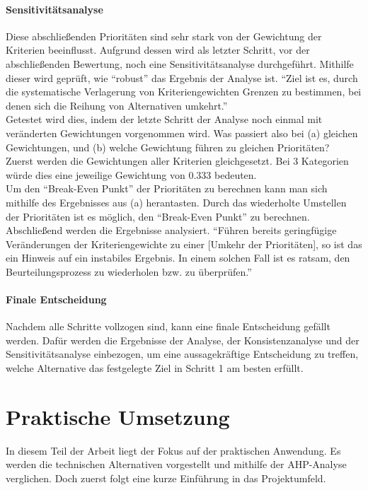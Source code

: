 \subsubsection{Sensitivitätsanalyse}
Diese abschließenden Prioritäten sind sehr stark von der Gewichtung der Kriterien beeinflusst.\autocite[Vgl.][S.19]{Mu.2018} Aufgrund dessen wird als letzter Schritt, vor der abschließenden Bewertung, noch eine Sensitivitätsanalyse durchgeführt. Mithilfe dieser wird geprüft, wie \enquote{robust} das Ergebnis der Analyse ist.\autocite[Vgl.][S.20]{Mu.2018} \enquote{Ziel ist es, durch die systematische Verlagerung von Kriteriengewichten Grenzen zu bestimmen, bei denen sich die Reihung von Alternativen umkehrt.}\autocite[S.111]{Fink.2006}\\ 
Getestet wird dies, indem der letzte Schritt der Analyse noch einmal mit veränderten Gewichtungen vorgenommen wird. Was passiert also bei (a) gleichen Gewichtungen, und (b) welche Gewichtung führen zu gleichen Prioritäten?\autocite[Vgl.][S.20]{Mu.2018}\\
Zuerst werden die Gewichtungen aller Kriterien gleichgesetzt. Bei 3 Kategorien würde dies eine jeweilige Gewichtung von $0.333$ bedeuten.\\
Um den \enquote{Break-Even Punkt}\autocite[S.21]{Mu.2018} der Prioritäten zu berechnen kann man sich mithilfe des Ergebnisses aus (a) herantasten. Durch das wiederholte Umstellen der Prioritäten ist es möglich, den \enquote{Break-Even Punkt} zu berechnen. Abschließend werden die Ergebnisse analysiert. \enquote{Führen bereits geringfügige Veränderungen der Kriteriengewichte zu einer [Umkehr der Prioritäten], so ist das ein Hinweis auf ein instabiles Ergebnis. In einem solchen Fall ist es ratsam, den Beurteilungsprozess zu wiederholen bzw. zu überprüfen.}\autocite[S.111]{Fink.2006}
\subsubsection{Finale Entscheidung}
Nachdem alle Schritte vollzogen sind, kann eine finale Entscheidung gefällt werden. Dafür werden die Ergebnisse der Analyse, der Konsistenzanalyse und der Sensitivitätsanalyse einbezogen, um eine aussagekräftige Entscheidung zu treffen, welche Alternative das festgelegte Ziel in Schritt 1 am besten erfüllt.
\chapter{Praktische Umsetzung}\label{pract}
In diesem Teil der Arbeit liegt der Fokus auf der praktischen Anwendung. Es werden die technischen Alternativen vorgestellt und mithilfe der AHP-Analyse verglichen. Doch zuerst folgt eine kurze Einführung in das Projektumfeld.
